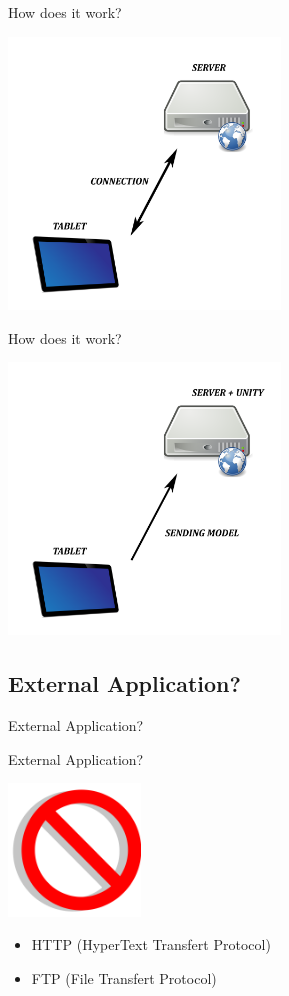 \documentclass[a4paper,10pt]{beamer}
\begin{document}
			\begin{frame}{How does it work?}
				\centerline{\includegraphics[height=205pt]{images/network/connection.png}}
			\end{frame}
			
			\begin{frame}{How does it work?}
				\centerline{\includegraphics[height=205pt]{images/network/sending_model.png}}
			\end{frame}
		
		\subsection{External Application?}
			
			\begin{frame}{External Application?}
				
			\end{frame}
			
			\begin{frame}{External Application?}
				\centerline{\includegraphics[height=100pt]{images/network/no.png}}
				\begin{itemize}
					\item HTTP (HyperText Transfert Protocol)
					\item FTP (File Transfert Protocol)
				\end{itemize}
			\end{frame}
		
\end{document}
